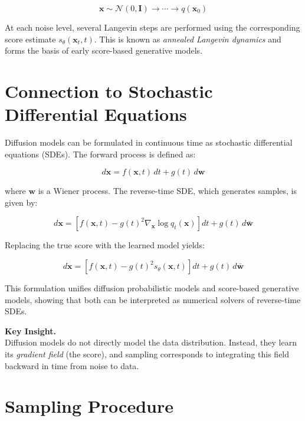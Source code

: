 \begin{equation}
\mathbf{x} \sim \mathcal{N}(0, \mathbf{I}) \rightarrow \cdots \rightarrow q(\mathbf{x}_0)
\end{equation}

At each noise level, several Langevin steps are performed using the corresponding score estimate $s_\theta(\mathbf{x}_t, t)$. This is known as \textit{annealed Langevin dynamics} and forms the basis of early score-based generative models.

\section{Connection to Stochastic Differential Equations}

Diffusion models can be formulated in continuous time as stochastic differential equations (SDEs). The forward process is defined as:

\begin{equation}
d\mathbf{x} = f(\mathbf{x}, t)\,dt + g(t)\,d\mathbf{w}
\end{equation}

where $\mathbf{w}$ is a Wiener process. The reverse-time SDE, which generates samples, is given by:

\begin{equation}
d\mathbf{x} =
\left[
f(\mathbf{x}, t) - g(t)^2 \nabla_{\mathbf{x}} \log q_t(\mathbf{x})
\right] dt
+
g(t)\,d\bar{\mathbf{w}}
\end{equation}

Replacing the true score with the learned model yields:

\begin{equation}
d\mathbf{x} =
\left[
f(\mathbf{x}, t) - g(t)^2 s_\theta(\mathbf{x}, t)
\right] dt
+
g(t)\,d\bar{\mathbf{w}}
\end{equation}

This formulation unifies diffusion probabilistic models and score-based generative models, showing that both can be interpreted as numerical solvers of reverse-time SDEs.

\vspace{0.5em}
\noindent
\textbf{Key Insight.} \\
Diffusion models do not directly model the data distribution. Instead, they learn its \textit{gradient field} (the score), and sampling corresponds to integrating this field backward in time from noise to data.

\section{Sampling Procedure}

